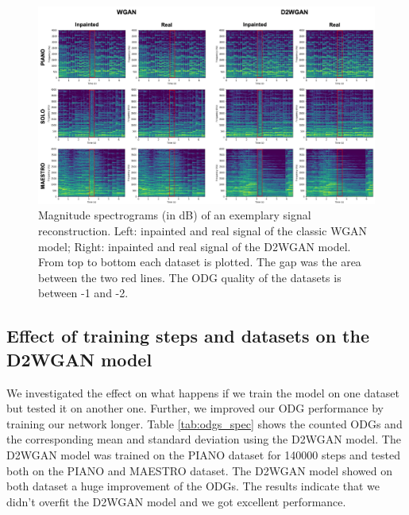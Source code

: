 \documentclass{article} %
\begin{document}
\begin{figure}[ht]
    \includegraphics[scale=0.124]{images/spectrograms.jpg}
    \centering
    \caption{Magnitude spectrograms (in dB) of an exemplary signal reconstruction. Left: inpainted and real signal of the classic WGAN model; Right: inpainted and real signal of the D2WGAN model. From top to bottom each dataset is plotted. The gap was the area between the two red lines. The ODG quality of the datasets is between -1 and -2.}
    \label{fig:spectrogram}
\end{figure}


\subsection{Effect of training steps and datasets on the D2WGAN model}
We investigated the effect on what happens if we train the model on one dataset but tested it on another one. Further, we improved our ODG performance by training our network longer. Table \ref{tab:odgs_spec} shows the counted ODGs and the corresponding mean and standard deviation using the D2WGAN model. The D2WGAN model was trained on the PIANO dataset for 140000 steps and tested both on the PIANO and MAESTRO dataset. The D2WGAN model showed on both dataset a huge improvement of the ODGs. The results indicate that we didn't overfit the D2WGAN model and we got excellent performance.
\end{document}
